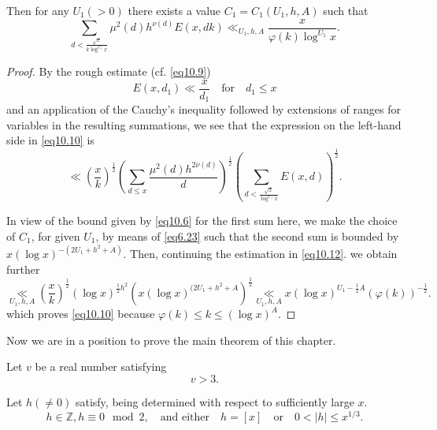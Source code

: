 Then for any $U_1 (>0)$ there exists a value $C_1 = C_1 (U_1, h, A)$
such that 
\begin{equation*}
\sum_{d < \frac{\sqrt{x}}{k \log^{C_1}x}} \mu^2 (d) h^{\nu (d)} E(x,
dk) \ll_{U_1, h, A} \frac{x}{\varphi (k)
  \log^{U_1}x}. \tag{10.10}\label{eq10.10}  
\end{equation*}

\begin{proof}
By the rough estimate (cf. \eqref{eq10.9})
\begin{equation*}
E(x, d_1) \ll \frac{x}{d_1}\quad \text{for}\quad d_1 \le x
\tag{10.11}\label{eq10.11}  
\end{equation*}
and an application of the Cauchy's inequality followed by extensions
of ranges for variables in the resulting summations, we see that the
expression on the left-hand side in \eqref{eq10.10} is 
\begin{equation*}
\ll (\frac{x}{k})^{\frac{1}{2}} ( \sum_{d \le x} \frac{\mu^2 (d) h^{2
    \nu (d)}}{d})^{\frac{1}{2}} (\sum_{d <
  \frac{\sqrt{x}}{\log^{C_1}x}} E(x,
d))^{\frac{1}{2}}. \tag{10.12}\label{eq10.12}  
\end{equation*}\pageoriginale

In view of the bound given by \eqref{eq10.6} for the first sum here, we make
the choice of $C_1$, for given $U_1$, by means of \eqref{eq6.23} such that
the second sum is bounded by $x (\log x)^{- (2U_1+h^2+A)}$. Then,
continuing the estimation in \eqref{eq10.12}. we obtain further 
\begin{equation*}
\underset{U_1, h, A} \ll (\frac{x}{k})^{\frac{1}{2}} (\log
x)^{\frac{1}{2}h^2} (x (\log x)^{(2U_1 + h^2 + A})^{\frac{1}{2}}
\underset{U_1, h, A} \ll x(\log x)^{U_1 - \frac{1}{2}A}
(\varphi(k))^{-\frac{1}{2}}. \tag{10.13}\label{eq10.13} 
\end{equation*}
which proves \eqref{eq10.10} because $\varphi(k) \le k \le (\log x)^A$.
\end{proof}

Now we are in a position to prove the main theorem of this chapter.

\begin{theorem}\label{chap10-thm10.3}%
Let $v$ be a real number satisfying
\begin{equation*}
v > 3. \tag {10.14}\label{eq10.14}
\end{equation*}
\end{theorem}

Let $h (\neq 0)$ satisfy, being determined with respect to
sufficiently large $x$. 
\begin{equation*}
h \in \mathbb{Z}, h \equiv 0 \mod 2,\quad \text{and either}\quad h = [x]
\quad\text{or}\quad 0<|h| \le x^{1/3}. \tag{10.15}\label{eq10.15} 
\end{equation*}

